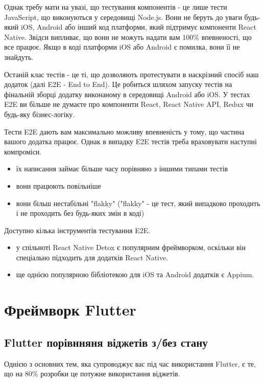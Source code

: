 Однак требу мати на увазі, що тестування компонентів - це лише тести JavaScript, що виконуються у середовищі Node.js.
Вони не беруть до уваги будь-який iOS, Android або інший код платформи, який підтримує компоненти React Native.
Звідси випливає, що вони не можуть надати вам 100\% впевненості, що все працює.
Якщо в коді платформи iOS або Android є помилка, вони її не знайдуть.

Останій клас тестів - це ті, що дозволяють протестувати в наскрізний спосіб наш додаток (далі E2E - End to End).
Це робиться шляхом запуску тестів на фінальній зборці додатку виконаному в середовищі Android або iOS.
У тестах E2E ви більше не думаєте про компоненти React, React Native API, Redux чи будь-яку бізнес-логіку.

Тести E2E дають вам максимально можливу впевненість у тому, що частина вашого додатка працює.
Однак в випадку E2E тестів треба враховувати наступні компроміси.

\begin{itemize}
    \item їх написання займає більше часу порівняно з іншими типами тестів
    \item вони працюють повільніше
    \item вони більш нестабільні "flakky" ("flakky"  - це тест, який випадково проходить і не проходить без будь-яких змін в коді)
\end{itemize}

Доступно кілька інструментів тестування E2E.
\begin{itemize}
    \item у спільноті React Native Detox є популярним фреймворком, оскільки він спеціально підходить для додатків React Native.\cite{detox_home_page}
    \item ще однією популярною бібліотекою для iOS та Android додатків є Appium.\cite{appium_home_page}
\end{itemize}


\section{Фреймворк Flutter}
\label{sec:flutter}

\subsection{Flutter порівнняня віджетів з/без стану}
\label{subsec:flutter_widgets_theory}
Однією з основних тем, яка супроводжує вас під час використання Flutter, є те, що на 80\% розробки це потужне використання віджетів.

